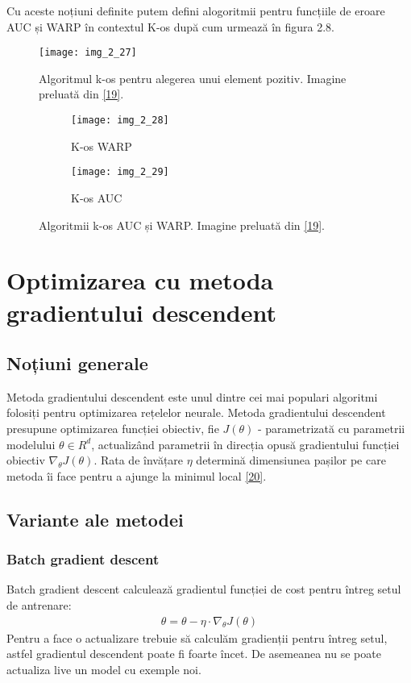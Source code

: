 Cu aceste noțiuni definite putem defini alogoritmii pentru funcțiile de eroare AUC și WARP în contextul K-os după cum urmează în figura 2.8.
\begin{figure}[!h]
	\centering
	\texttt{[image: img\_2\_27]}
	\caption[Algoritmul k-os pentru alegerea unui element pozitiv]{Algoritmul k-os pentru alegerea unui element pozitiv. Imagine preluată din \hyperlink{jasonkos}{[19]}.}
\end{figure} 

\begin{figure}[!tbp]
  \begin{subfigure}[b]{0.4\textwidth}
    \texttt{[image: img\_2\_28]}
    \caption{K-os WARP}
    \label{fig:f1}
  \end{subfigure}
  \hfill
  \begin{subfigure}[b]{0.5\textwidth}
    \texttt{[image: img\_2\_29]}
    \caption{K-os AUC}
    \label{fig:f2}
  \end{subfigure}
  \caption[Algoritmii k-os AUC și WARP]{Algoritmii k-os AUC și WARP. Imagine preluată din \hyperlink{jasonkos}{[19]}.}
\end{figure}

\section{Optimizarea cu metoda gradientului descendent}
\subsection{Noțiuni generale}
Metoda gradientului descendent este unul dintre cei mai populari algoritmi folosiți pentru optimizarea rețelelor neurale. Metoda gradientului descendent presupune optimizarea funcției obiectiv, fie $J(\theta)$ - parametrizată cu parametrii modelului $\theta \in R^d$, actualizând parametrii în direcția opusă gradientului funcției obiectiv $\nabla_{\theta}J(\theta)$. Rata de învățare $\eta$ determină dimensiunea pașilor pe care metoda îi face pentru a ajunge la minimul local \hyperlink{ruder2016}{[20]}.

\subsection{Variante ale metodei}
\subsubsection{Batch gradient descent}
Batch gradient descent calculează gradientul funcției de cost pentru întreg setul de antrenare:
\begin{align}
	\theta = \theta - \eta \cdot \nabla_{\theta}J(\theta)
\end{align}
Pentru a face o actualizare trebuie să calculăm gradienții pentru întreg setul, astfel gradientul descendent poate fi foarte încet. De asemeanea nu se poate actualiza live un model cu exemple noi.

